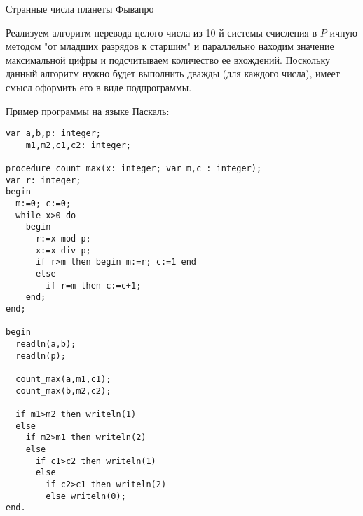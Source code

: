 \begin{tutorial}{Странные числа планеты Фывапро}

Реализуем алгоритм перевода целого числа из 10-й системы счисления в $P$-ичную методом "от младших разрядов к старшим" и параллельно находим значение максимальной цифры и подсчитываем количество ее вхождений. Поскольку данный алгоритм нужно будет выполнить дважды (для каждого числа), имеет смысл оформить его в виде подпрограммы.

Пример программы на языке Паскаль:
\begin{verbatim}
var a,b,p: integer;
    m1,m2,c1,c2: integer;
    
procedure count_max(x: integer; var m,c : integer);
var r: integer;
begin
  m:=0; c:=0;
  while x>0 do
    begin
      r:=x mod p;
      x:=x div p;
      if r>m then begin m:=r; c:=1 end
      else
        if r=m then c:=c+1;
    end;
end;

begin
  readln(a,b);
  readln(p);

  count_max(a,m1,c1);
  count_max(b,m2,c2);
  
  if m1>m2 then writeln(1)
  else
    if m2>m1 then writeln(2)
    else 
      if c1>c2 then writeln(1)
      else
        if c2>c1 then writeln(2)
        else writeln(0);
end.
\end{verbatim}

\end{tutorial}
